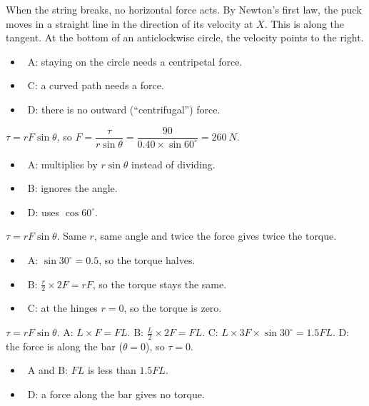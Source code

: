 \documentclass[12pt]{article}
\begin{document}
\begin{practiceanswers}
\begin{practiceans}
  When the string breaks, no horizontal force acts. By Newton's first law, the puck moves in a
  straight line in the direction of its velocity at $X$. This is along the tangent. At the bottom
  of an anticlockwise circle, the velocity points to the right.
  \begin{itemize}
    \item \xmark\ A: staying on the circle needs a centripetal force.
    \item \xmark\ C: a curved path needs a force.
    \item \xmark\ D: there is no outward (“centrifugal”) force.
  \end{itemize}
\end{practiceans}

\begin{practiceans}
  $\tau = rF\sin\theta$, so $F = \dfrac{\tau}{r\sin\theta} = \dfrac{90}{0.40 \times \sin 60^\circ}
  = \qty{260}{N}$.
  \begin{itemize}
    \item \xmark\ A: multiplies by $r\sin\theta$ instead of dividing.
    \item \xmark\ B: ignores the angle.
    \item \xmark\ D: uses $\cos 60^\circ$.
  \end{itemize}
\end{practiceans}

\begin{practiceans}
  $\tau = rF\sin\theta$. Same $r$, same angle and twice the force gives twice the torque.
  \begin{itemize}
    \item \xmark\ A: $\sin 30^\circ = 0.5$, so the torque halves.
    \item \xmark\ B: $\frac{r}{2} \times 2F = rF$, so the torque stays the same.
    \item \xmark\ C: at the hinges $r = 0$, so the torque is zero.
  \end{itemize}
\end{practiceans}

\begin{practiceans}
  $\tau = rF\sin\theta$. A: $L \times F = FL$. B: $\frac{L}{2} \times 2F = FL$.
  C: $L \times 3F \times \sin 30^\circ = 1.5FL$. D: the force is along the bar ($\theta = 0$), so
  $\tau = 0$.
  \begin{itemize}
    \item \xmark\ A and B: $FL$ is less than $1.5FL$.
    \item \xmark\ D: a force along the bar gives no torque.
  \end{itemize}
\end{practiceans}


\end{practiceanswers}
\end{document}
